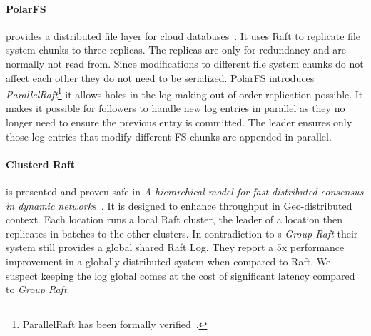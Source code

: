 \paragraph{PolarFS} provides a distributed file layer for cloud databases~\cite{polarfs}. It uses Raft to replicate file system chunks to three replicas. The replicas are only for redundancy and are normally not read from. Since modifications to different file system chunks do not affect each other they do not need to be serialized. PolarFS introduces \textit{ParallelRaft}\footnote{ParallelRaft has been formally verified~\cite{verify}.} it allows holes in the log making out-of-order replication possible. It makes it possible for followers to handle new log entries in parallel as they no longer need to ensure the previous entry is committed. The leader ensures only those log entries that modify different FS chunks are appended in parallel.
%
\paragraph{Clusterd Raft} is presented and proven safe in \textit{A hierarchical model for fast distributed consensus in dynamic networks}~\cite{craft}. It is designed to enhance throughput in Geo-distributed context. Each location runs a local Raft cluster, the leader of a location then replicates in batches to the other clusters. In contradiction to \name{}s \textit{Group Raft} their system still provides a global shared Raft Log. They report a 5x performance improvement in a globally distributed system when compared to Raft. We suspect keeping the log global comes at the cost of significant latency compared to \textit{Group Raft}.
